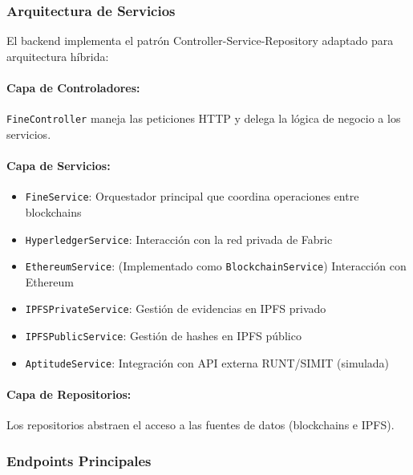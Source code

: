 \subsubsection{Arquitectura de Servicios}

El backend implementa el patrón Controller-Service-Repository adaptado para arquitectura híbrida:

\paragraph{Capa de Controladores:}
\texttt{FineController} maneja las peticiones HTTP y delega la lógica de negocio a los servicios.

\paragraph{Capa de Servicios:}
\begin{itemize}
    \item \texttt{FineService}: Orquestador principal que coordina operaciones entre blockchains
    \item \texttt{HyperledgerService}: Interacción con la red privada de Fabric
    \item \texttt{EthereumService}: (Implementado como \texttt{BlockchainService}) Interacción con Ethereum
    \item \texttt{IPFSPrivateService}: Gestión de evidencias en IPFS privado
    \item \texttt{IPFSPublicService}: Gestión de hashes en IPFS público
    \item \texttt{AptitudeService}: Integración con API externa RUNT/SIMIT (simulada)
\end{itemize}

\paragraph{Capa de Repositorios:}
Los repositorios abstraen el acceso a las fuentes de datos (blockchains e IPFS).

\subsubsection{Endpoints Principales}

